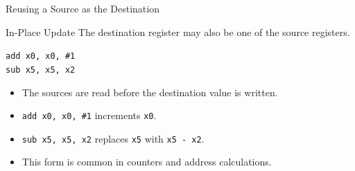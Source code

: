 \documentclass[aspectratio=169,11pt,t]{beamer}
\newcommand{\code}[1]{\texttt{#1}}
\begin{document}
\begin{frame}{Reusing a Source as the Destination}
\begin{block}{In-Place Update}
The destination register may also be one of the source registers.
\end{block}
\vspace{0.2cm}
\large
\hspace{3.0cm}\code{add x0, x0, \#1}\\[0.12cm]
\hspace{3.0cm}\code{sub x5, x5, x2}
\normalsize
\vspace{0.25cm}
\begin{itemize}
\item The sources are read before the destination value is written.
\item \code{add x0, x0, \#1} increments \code{x0}.
\item \code{sub x5, x5, x2} replaces \code{x5} with \code{x5 - x2}.
\item This form is common in counters and address calculations.
\end{itemize}
\end{frame}















\end{document}
